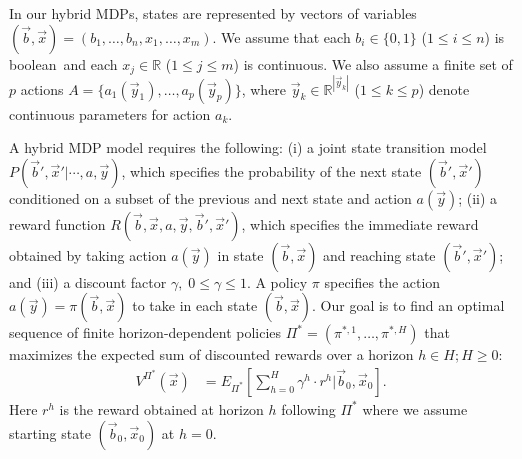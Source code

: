 \label{sec:csamdp}



In our hybrid MDPs, states are represented by vectors of variables
$(\vec{b},\vec{x}) = ( b_1,\ldots,b_n,x_{1},\ldots,x_m )$.  We assume
that each $b_i \in \{ 0,1 \}$ ($1 \leq i \leq n$) is boolean$\,$
and each $x_j \in \mathbb{R}$ ($1 \leq j \leq
m$) is continuous.  We also assume a finite set of $p$ actions $A = \{
a_1(\vec{y}_1), \ldots, a_p(\vec{y}_p) \}$, where 
$\vec{y}_k \in \mathbb{R}^{|\vec{y}_k|}$ ($1
\leq k \leq p$) denote continuous parameters for 
action $a_k$.

A hybrid MDP model requires the following: (i) a joint state transition model
$P(\vec{b}',\vec{x}'|\cdots,a,\vec{y})$, which specifies the
probability of the next state $(\vec{b}',\vec{x}')$ conditioned on a
subset of the previous and next state and action $a(\vec{y})$; (ii) a
reward function $R(\vec{b},\vec{x},a,\vec{y},\vec{b}',\vec{x}')$, which specifies the
immediate reward obtained by taking action $a(\vec{y})$ in state
$(\vec{b},\vec{x})$ and reaching state $(\vec{b}',\vec{x}')$; and (iii) a discount factor $\gamma, \; 0 \leq
\gamma \leq 1$.
A policy $\pi$ specifies the action $a(\vec{y}) =
\pi(\vec{b},\vec{x})$ to take in each state $(\vec{b},\vec{x})$.  Our
goal is to find an optimal sequence of finite horizon-dependent
policies
$\Pi^* = (\pi^{*,1},\ldots,\pi^{*,H})$ that
maximizes the expected sum of discounted rewards over a horizon $h \in
H; H \geq 0$:
\begin{align}
V^{\Pi^*}(\vec{x}) & = E_{\Pi^*} \left[ \sum_{h=0}^{H} \gamma^h \cdot r^h \Big| \vec{b}_0,\vec{x}_0 \right]. \label{eq:vfun_def}
\end{align}
Here $r^h$ is the reward obtained at horizon $h$ following $\Pi^*$ where 
we assume starting state $(\vec{b}_0,\vec{x}_0)$ at $h=0$.
 
